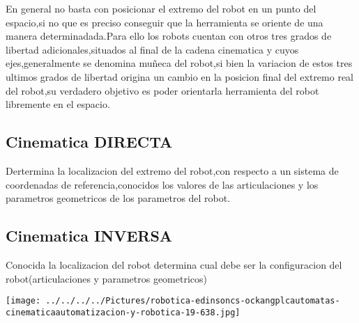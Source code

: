 \documentclass[12pt,a4paper]{article}
\begin{document}
En general no basta con posicionar el extremo del robot en un punto del espacio,si no que es preciso conseguir que la herramienta se oriente de una manera determinadada.Para ello los robots cuentan con otros tres grados de libertad adicionales,situados al final de la cadena cinematica y cuyos ejes,generalmente se denomina muñeca del robot,si bien la variacion de estos tres ultimos grados de libertad origina un cambio en la posicion final del extremo real del robot,su verdadero objetivo es poder orientarla herramienta del robot libremente en el espacio.


\subsection{Cinematica DIRECTA}
Dertermina la localizacion del extremo del robot,con respecto a un sistema de coordenadas de referencia,conocidos los valores de las articulaciones y los parametros geometricos de los parametros del robot.
\subsection{Cinematica INVERSA}
Conocida la localizacion del robot determina cual debe ser la configuracion del robot(articulaciones y parametros geometricos)

\texttt{[image: ../../../../Pictures/robotica-edinsoncs-ockangplcautomatas-cinematicaautomatizacion-y-robotica-19-638.jpg]} 
\end{document}

